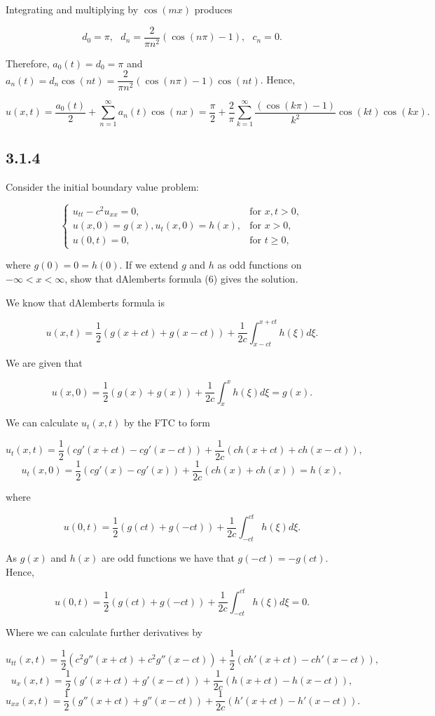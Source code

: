 \documentclass{article}
\begin{document}
Integrating and multiplying by $\cos(mx)$ produces

$$d_0=\pi,~~~ d_n=\frac{2}{\pi n^2}(\cos(n\pi) -1),~~~c_n=0. $$

Therefore, $a_0(t)=d_0=\pi$ and $a_n(t)=d_n\cos(nt)=\dfrac{2}{\pi n^2}(\cos(n\pi) -1)\cos(nt)$. Hence,

$$u(x,t)=\frac{a_0(t)}{2}+\sum_{n=1}^{\infty}a_n(t)\cos(nx)=\frac{\pi}{2}+\frac{2}{\pi}\sum_{k=1}^{\infty}\frac{(\cos(k\pi)-1)}{k^2}\cos(kt)\cos(kx).$$

\subsection{\textbf{3.1.4}} Consider the initial boundary value problem:

\[
  \begin{cases}
  u_{tt}-c^2 u_{xx}=0,  &\text{for $x,t>0$}, \\
  u(x,0)=g(x), u_t(x,0)=h(x), & \text{for $x>0$}, \\
  u(0,t)=0,  & \text{for $t\geq0$},
  \end{cases}
\]

where $g(0)=0=h(0)$. If we extend $g$ and $h$ as odd functions on $-\infty<x<\infty$, show that d\textsc{}Alembert\textsc{}s formula (6) gives the solution.

We know that d\textsc{}Alembert\textsc{}s formula is

$$u(x,t)=\frac{1}{2}(g(x+ct)+g(x-ct)) + \frac{1}{2c}\int_{x-ct}^{x+ct}h(\xi)d\xi.$$

We are given that

$$u(x,0)=\frac{1}{2}(g(x)+g(x)) + \frac{1}{2c}\int_{x}^{x}h(\xi)d\xi=g(x).$$

We can calculate $u_t(x,t)$ by the FTC to form

$$u_t(x,t)=\frac{1}{2}(cg'(x+ct)-cg'(x-ct)) + \frac{1}{2c}(ch(x+ct)+ch(x-ct)),$$
$$u_t(x,0)=\frac{1}{2}(cg'(x)-cg'(x)) + \frac{1}{2c}(ch(x)+ch(x))=h(x),$$

where

$$u(0,t)=\frac{1}{2}(g(ct)+g(-ct))+\frac{1}{2c}\int_{-ct}^{ct}h(\xi)d\xi.$$

As $g(x)$ and $h(x)$ are odd functions we have that $g(-ct)=-g(ct)$. Hence,

$$u(0,t)=\frac{1}{2}(g(ct)+g(-ct))+\frac{1}{2c}\int_{-ct}^{ct}h(\xi)d\xi=0.$$

Where we can calculate further derivatives by

$$u_{tt}(x,t)=\frac{1}{2}(c^2g''(x+ct)+c^2g''(x-ct)) + \frac{1}{2}(ch'(x+ct)-ch'(x-ct)),$$
$$u_x(x,t)=\frac{1}{2}(g'(x+ct)+g'(x-ct)) + \frac{1}{2c}(h(x+ct)-h(x-ct)),$$
$$u_{xx}(x,t)=\frac{1}{2}(g''(x+ct)+g''(x-ct)) + \frac{1}{2c}(h'(x+ct)-h'(x-ct)).$$
\end{document}
